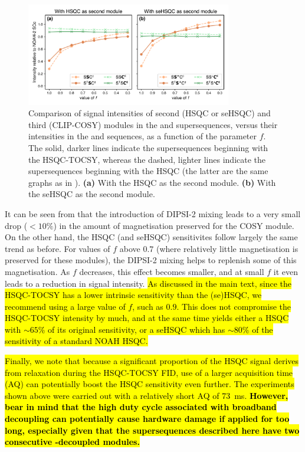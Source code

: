 \begin{figure}
    \centering
    \includegraphics[width=0.8\textwidth]{./figures/stsc_comparisons.png}
    \caption{
        Comparison of signal intensities of second (HSQC or seHSQC) and third (CLIP-COSY) modules in the  and  supersequences, versus their intensities in the  and  sequences, as a function of the parameter $f$.
        The solid, darker lines indicate the supersequences beginning with the HSQC-TOCSY, whereas the dashed, lighter lines indicate the supersequences beginning with the HSQC (the latter are the same graphs as in ).
        \textbf{(a)} With the HSQC as the second module.
        \textbf{(b)} With the seHSQC as the second module.
        \andro{}
    }
    \label{fig:stsc_comparisons}
\end{figure}

It can be seen from  that the introduction of DIPSI-2 mixing leads to a very small drop ($< 10\%$) in the amount of  magnetisation preserved for the COSY module.
On the other hand, the HSQC (and seHSQC) sensitivites follow largely the same trend as before.
For values of $f$ above $0.7$ (where relatively little  magnetisation is preserved for these modules), the DIPSI-2 mixing helps to replenish some of this magnetisation.
As $f$ decreases, this effect becomes smaller, and at small $f$ it even leads to a reduction in signal intensity.
\hl{
As discussed in the main text, since the HSQC-TOCSY has a lower intrinsic sensitivity than the (se)HSQC, we recommend using a large value of $f$, such as $0.9$.
This does not compromise the HSQC-TOCSY intensity by much, and at the same time yields either a HSQC with $\sim 65\%$ of its original sensitivity, or a seHSQC which has $\sim 80\%$ of the sensitivity of a standard NOAH HSQC.
}

\hl{
Finally, we note that because a significant proportion of the HSQC signal derives from  relaxation during the HSQC-TOCSY FID, use of a larger acquisition time (AQ) can potentially boost the HSQC sensitivity even further.
The experiments shown above were carried out with a relatively short AQ of \SI{73}{\ms}.
\textbf{However, bear in mind that the high duty cycle associated with broadband  decoupling can potentially cause hardware damage if applied for too long, especially given that the supersequences described here have two consecutive -decoupled modules.}
}

